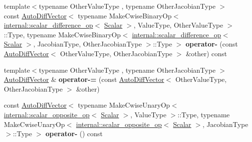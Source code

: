 \begin{DoxyCompactItemize}
\item 
\mbox{\label{class_eigen_1_1_auto_diff_vector_a90ba44e4e394a5cde3dd6706d42f90df}} 
{\footnotesize template$<$typename Other\+Value\+Type , typename Other\+Jacobian\+Type $>$ }\\const \hyperlink{class_eigen_1_1_auto_diff_vector}{Auto\+Diff\+Vector}$<$ typename Make\+Cwise\+Binary\+Op$<$ \hyperlink{struct_eigen_1_1internal_1_1scalar__difference__op}{internal\+::scalar\+\_\+difference\+\_\+op}$<$ \hyperlink{class_eigen_1_1_auto_diff_scalar}{Scalar} $>$, Value\+Type, Other\+Value\+Type $>$\+::Type, typename Make\+Cwise\+Binary\+Op$<$ \hyperlink{struct_eigen_1_1internal_1_1scalar__difference__op}{internal\+::scalar\+\_\+difference\+\_\+op}$<$ \hyperlink{class_eigen_1_1_auto_diff_scalar}{Scalar} $>$, Jacobian\+Type, Other\+Jacobian\+Type $>$\+::Type $>$ {\bfseries operator-\/} (const \hyperlink{class_eigen_1_1_auto_diff_vector}{Auto\+Diff\+Vector}$<$ Other\+Value\+Type, Other\+Jacobian\+Type $>$ \&other) const
\item 
\mbox{\label{class_eigen_1_1_auto_diff_vector_a8643a9d4537d9ea19edd4fb8911b532a}} 
{\footnotesize template$<$typename Other\+Value\+Type , typename Other\+Jacobian\+Type $>$ }\\\hyperlink{class_eigen_1_1_auto_diff_vector}{Auto\+Diff\+Vector} \& {\bfseries operator-\/=} (const \hyperlink{class_eigen_1_1_auto_diff_vector}{Auto\+Diff\+Vector}$<$ Other\+Value\+Type, Other\+Jacobian\+Type $>$ \&other)
\item 
\mbox{\label{class_eigen_1_1_auto_diff_vector_a5b60e5830761efb351d6dd410c824b4e}} 
const \hyperlink{class_eigen_1_1_auto_diff_vector}{Auto\+Diff\+Vector}$<$ typename Make\+Cwise\+Unary\+Op$<$ \hyperlink{struct_eigen_1_1internal_1_1scalar__opposite__op}{internal\+::scalar\+\_\+opposite\+\_\+op}$<$ \hyperlink{class_eigen_1_1_auto_diff_scalar}{Scalar} $>$, Value\+Type $>$\+::Type, typename Make\+Cwise\+Unary\+Op$<$ \hyperlink{struct_eigen_1_1internal_1_1scalar__opposite__op}{internal\+::scalar\+\_\+opposite\+\_\+op}$<$ \hyperlink{class_eigen_1_1_auto_diff_scalar}{Scalar} $>$, Jacobian\+Type $>$\+::Type $>$ {\bfseries operator-\/} () const
\item 
\mbox{\label{class_eigen_1_1_auto_diff_vector_a05674ef2fa708ff752109d194c53d60e}} 

\end{DoxyCompactItemize}
